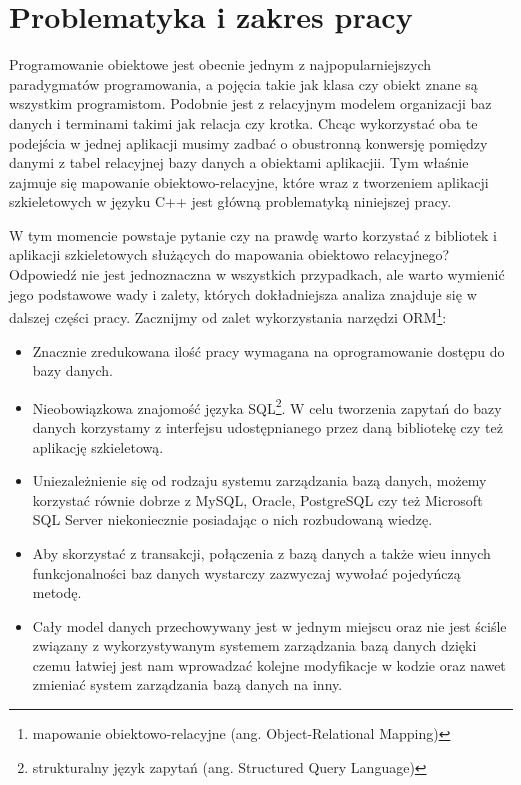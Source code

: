 \documentclass[12pt]{report}
\begin{document}
\section{Problematyka i zakres pracy}

Programowanie obiektowe jest obecnie jednym z najpopularniejszych pa\-ra\-dy\-gma\-tów programowania, a pojęcia takie jak klasa czy obiekt znane są wszystkim programistom.
Podobnie jest z relacyjnym modelem organizacji baz danych i terminami takimi jak relacja czy krotka. Chcąc wykorzystać oba te podejścia w jednej aplikacji musimy zadbać o 
obustronną konwersję pomiędzy danymi z tabel relacyjnej bazy danych a obiektami aplikacjii. Tym właśnie zajmuje się mapowanie obiektowo-relacyjne, które wraz z tworzeniem 
aplikacji szkieletowych w języku C++ jest główną problematyką niniejszej pracy.

W tym momencie powstaje pytanie czy na prawdę warto korzystać z bibliotek i aplikacji szkieletowych służących do mapowania obiektowo relacyjnego? Od\-po\-wiedź nie jest
jednoznaczna w wszystkich przypadkach, ale warto wymienić jego podstawowe wady i zalety, których dokładniejsza analiza znajduje się w dalszej części pracy. Zacznijmy od zalet 
wykorzystania narzędzi ORM\footnote{mapowanie obiektowo-relacyjne (ang. Object-Relational Mapping)}:

\begin{itemize}
\item Znacznie zredukowana ilość pracy wymagana na oprogramowanie dostępu do bazy danych.
\item Nieobowiązkowa znajomość języka SQL\footnote{strukturalny język zapytań (ang. Structured Query Language)}. W celu tworzenia zapytań do bazy
danych korzystamy z interfejsu udostępnianego przez daną bibliotekę czy też aplikację szkieletową.
\item Uniezależnienie się od rodzaju systemu zarządzania bazą danych, możemy korzystać równie dobrze z MySQL, Oracle, PostgreSQL czy też Microsoft SQL Server
niekoniecznie posiadając o nich rozbudowaną wiedzę.
\item Aby skorzystać z transakcji, połączenia z bazą danych a także wieu innych funkcjonalności baz danych wystarczy zazwyczaj wywołać pojedyńczą me\-to\-dę.
\item Cały model danych przechowywany jest w jednym miejscu oraz nie jest ściśle związany z wykorzystywanym systemem zarządzania bazą danych dzięki cze\-mu łatwiej 
jest nam wprowadzać kolejne modyfikacje w kodzie oraz nawet zmieniać system zarządzania bazą danych na inny.
\end{itemize}
\end{document}
